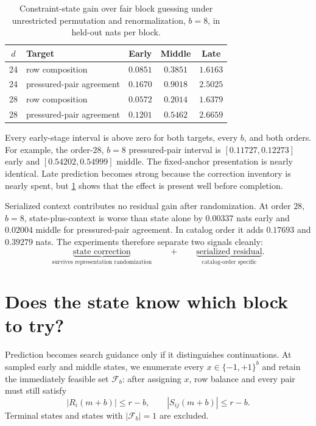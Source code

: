 \documentclass[10pt,twoside]{article}
\theoremstyle{noteplain}
\theoremstyle{definition}
\newcommand{\F}{\mathcal{F}}
\begin{document}
\begin{table}[t]
\centering
\caption{Constraint-state gain over fair block guessing under unrestricted permutation and renormalization, $b=8$, in held-out nats per block.}
\label{tab:regional}
\small
\begin{tabular}{@{}clccc@{}}
\toprule
$d$ & Target & Early & Middle & Late \\
\midrule
24 & row composition & $0.0851$ & $0.3851$ & $1.6163$ \\
24 & pressured-pair agreement & $0.1670$ & $0.9018$ & $2.5025$ \\
28 & row composition & $0.0572$ & $0.2014$ & $1.6379$ \\
28 & pressured-pair agreement & $0.1201$ & $0.5462$ & $2.6659$ \\
\bottomrule
\end{tabular}
\end{table}

Every early-stage interval is above zero for both targets, every $b$, and both orders.  For example, the order-$28$, $b=8$ pressured-pair interval is $[0.11727,0.12273]$ early and $[0.54202,0.54999]$ middle.  The fixed-anchor presentation is nearly identical.  Late prediction becomes strong because the correction inventory is nearly spent, but \cref{tab:regional} shows that the effect is present well before completion.

Serialized context contributes no residual gain after randomization.  At order $28$, $b=8$, state-plus-context is worse than state alone by $0.00337$ nats early and $0.02004$ middle for pressured-pair agreement.  In catalog order it adds $0.17693$ and $0.39279$ nats.  The experiments therefore separate two signals cleanly:
\begin{equation}\label{eq:separation}
\underbrace{\text{state correction}}_{\text{survives representation randomization}}
\qquad+\qquad
\underbrace{\text{serialized residual}}_{\text{catalog-order specific}}.
\end{equation}

\section{Does the state know which block to try?}

Prediction becomes search guidance only if it distinguishes continuations.  At sampled early and middle states, we enumerate every $x\in\{-1,+1\}^b$ and retain the immediately feasible set $\F_b$: after assigning $x$, row balance and every pair must still satisfy
\begin{equation}\label{eq:feasible}
|R_i(m+b)|\le r-b,
\qquad
|S_{ij}(m+b)|\le r-b.
\end{equation}
Terminal states and states with $|\F_b|=1$ are excluded.
\end{document}
